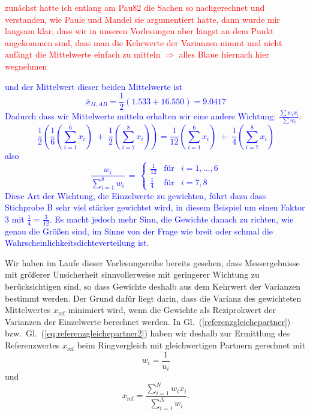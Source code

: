 \textcolor{red}{zunächst hatte ich entlang am Pau82 die Sachen so nachgerechnet und verstanden, wie
Paule und Mandel sie argumentiert hatte, dann wurde mir langsam klar, dass wir in unseren Vorlesungen
aber längst an dem Punkt angekommen sind, dass man die Kehrwerte der Varianzen nimmt und nicht
anfängt die Mittelwerte einfach zu mitteln $\Rightarrow$ alles Blaue hiernach hier wegnehmen}

\textcolor{blue}{und der Mittelwert dieser beiden Mittelwerte ist
 \begin{equation}
  \bar x_{II,AB} = \frac{1}{2}\left( 1.533 + 16.550 \right) = 9.0417
 \label{eq:Mittelwerte_x_IIAB}
 \end{equation}
 Dadurch dass wir Mittelwerte mitteln erhalten wir eine andere Wichtung: $\frac{\sum w_i x_i}{\sum w_i}$:
$$
\frac{1}{2} \left( \frac{1}{6} \left(\sum\limits_{i=1}^6 x_i \right) \; + \;
    \frac{1}{2} \left(\sum\limits_{i=7}^8 x_i \right)  \right) =
 \frac{1}{12} \left(\sum\limits_{i=1}^6 x_i \right) \; + \;
    \frac{1}{4} \left(\sum\limits_{i=7}^8 x_i \right)
$$
also 
$$
\frac{w_i}{\sum\limits_{i=1}^8 w_i} \, = \, 
\left\{ \begin{array}{ccl}
\frac{1}{12} & \text{f{\"u}r} & i = 1,\dots,6 \\
\frac{1}{4} & \text{f{\"u}r} & i = 7, 8
\end{array} \right.
$$
Diese Art der Wichtung, die Einzelwerte zu gewichten, führt dazu dass Stichprobe B
sehr viel stärker gewichtet wird, in diesem Beispiel um einen Faktor $3$ mit $\frac{1}{4} = \frac{3}{12}$.
Es macht jedoch mehr Sinn, die Gewichte danach zu richten, wie genau die Größen sind,
im Sinne von der Frage wie breit oder schmal die Wahrscheinlichkeitsdichteverteilung ist.}


Wir haben im Laufe dieser Vorlesungsreihe bereits gesehen, dass
Messergebnisse mit größerer Unsicherheit sinnvollerweise mit geringerer
Wichtung zu berücksichtigen sind, so dass Gewichte
deshalb aus dem Kehrwert der Varianzen bestimmt werden. Der Grund dafür liegt darin,
dass die Varianz des gewichteten Mittelwertes $x_\mathrm{ref}$ minimiert wird,
wenn die Gewichte als Reziprokwert der Varianzen der Einzelwerte berechnet werden.
In Gl.~(\ref{referenzgleichepartner}) bzw.\ Gl.~(\ref{eq:referenzgleichepartner2}) 
haben wir deshalb zur Ermittlung des Referenzwertes $x_\mathrm{ref}$ beim
Ringvergleich mit gleichwertigen Partnern gerechnet mit
\begin{equation*}
    w_i = \frac{1}{u_i}
\end{equation*}
und
\begin{equation*}
 x_\mathrm{ref} = \frac{\sum\limits_{i=1}^N w_i x_i}{\sum\limits_{i=1}^N w_i} .
\end{equation*}

